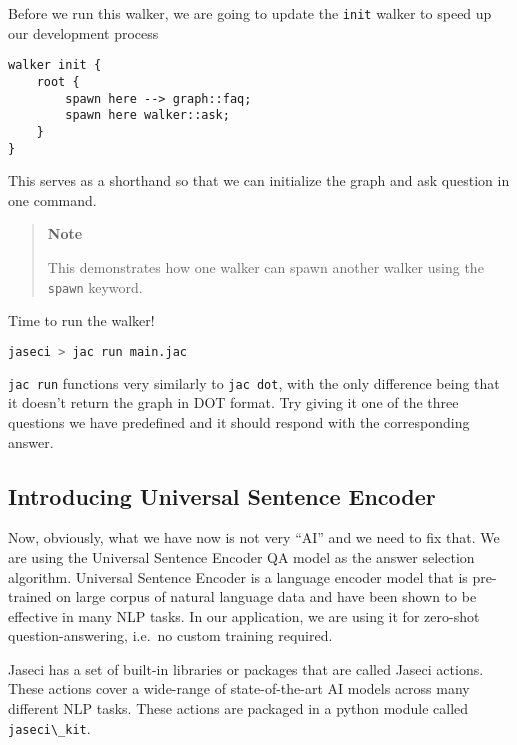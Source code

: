 Before we run this walker, we are going to update the
\passthrough{\lstinline!init!} walker to speed up our development
process

\begin{lstlisting}
walker init {
    root {
        spawn here --> graph::faq;
        spawn here walker::ask;
    }
}
\end{lstlisting}

This serves as a shorthand so that we can initialize the graph and ask
question in one command.

\begin{quote}
\textbf{Note}

This demonstrates how one walker can spawn another walker using the
\passthrough{\lstinline!spawn!} keyword.
\end{quote}

Time to run the walker!

\begin{lstlisting}[language=bash]
jaseci > jac run main.jac
\end{lstlisting}

\passthrough{\lstinline!jac run!} functions very similarly to
\passthrough{\lstinline!jac dot!}, with the only difference being that
it doesn't return the graph in DOT format. Try giving it one of the
three questions we have predefined and it should respond with the
corresponding answer.

\hypertarget{introducing-universal-sentence-encoder}{%
\subsection{Introducing Universal Sentence
Encoder}\label{introducing-universal-sentence-encoder}}

Now, obviously, what we have now is not very ``AI'' and we need to fix
that. We are using the Universal Sentence Encoder QA model as the answer
selection algorithm. Universal Sentence Encoder is a language encoder
model that is pre-trained on large corpus of natural language data and
have been shown to be effective in many NLP tasks. In our application,
we are using it for zero-shot question-answering, i.e.~no custom
training required.

Jaseci has a set of built-in libraries or packages that are called
Jaseci actions. These actions cover a wide-range of state-of-the-art AI
models across many different NLP tasks. These actions are packaged in a
python module called \passthrough{\lstinline!jaseci\_kit!}.

